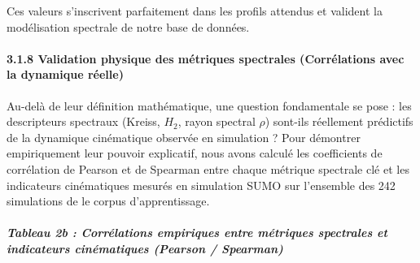 \documentclass[10pt, a4paper]{article}
\begin{document}
Ces valeurs s'inscrivent parfaitement dans les profils attendus et
valident la modélisation spectrale de notre base de données.

\paragraph{3.1.8 Validation physique des métriques spectrales
(Corrélations avec la dynamique
réelle)}\label{validation-physique-des-muxe9triques-spectrales-corruxe9lations-avec-la-dynamique-ruxe9elle}

Au-delà de leur définition mathématique, une question fondamentale se
pose : les descripteurs spectraux (Kreiss, \(H_2\), rayon spectral
\(\rho\)) sont-ils réellement prédictifs de la dynamique cinématique
observée en simulation ? Pour démontrer empiriquement leur pouvoir
explicatif, nous avons calculé les coefficients de corrélation de
Pearson et de Spearman entre chaque métrique spectrale clé et les
indicateurs cinématiques mesurés en simulation SUMO sur l'ensemble des
242 simulations de le corpus d'apprentissage.

\subparagraph{Tableau 2b : Corrélations empiriques entre métriques
spectrales et indicateurs cinématiques (Pearson /
Spearman)}\label{tableau-2b-corruxe9lations-empiriques-entre-muxe9triques-spectrales-et-indicateurs-cinuxe9matiques-pearson-spearman}
\end{document}

